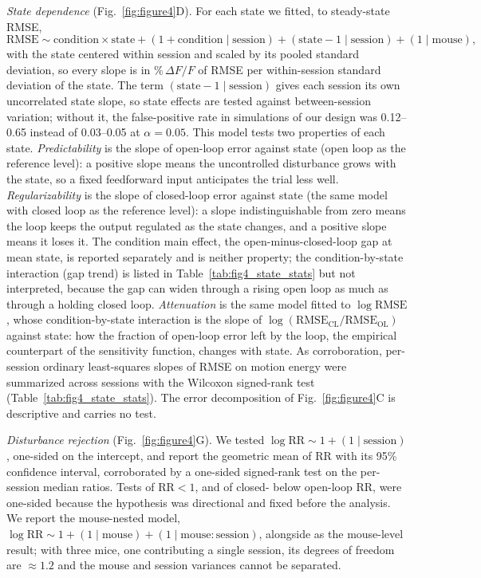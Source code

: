 \emph{State dependence} (Fig.~\ref{fig:figure4}D). For each state we fitted, to
steady-state RMSE,
\begin{equation*}
    \mathrm{RMSE} \sim \mathrm{condition} \times \mathrm{state}
    + (1 + \mathrm{condition} \mid \mathrm{session})
    + (\mathrm{state} - 1 \mid \mathrm{session})
    + (1 \mid \mathrm{mouse}),
\end{equation*}
with the state centered within session and scaled by its pooled standard
deviation, so every slope is in $\%\,\Delta F/F$ of RMSE per within-session
standard deviation of the state. The term $(\mathrm{state} - 1 \mid
\mathrm{session})$ gives each session its own uncorrelated state slope, so state
effects are tested against between-session variation; without it, the
false-positive rate in simulations of our design was 0.12--0.65 instead of
0.03--0.05 at $\alpha = 0.05$. This model tests two properties of each state.
\emph{Predictability} is the slope of open-loop error against state (open loop
as the reference level): a positive slope means the uncontrolled disturbance
grows with the state, so a fixed feedforward input anticipates the trial less
well. \emph{Regularizability} is the slope of closed-loop error against state
(the same model with closed loop as the reference level): a slope
indistinguishable from zero means the loop keeps the output regulated as the
state changes, and a positive slope means it loses it. The condition main
effect, the open-minus-closed-loop gap at mean state, is reported separately and
is neither property; the condition-by-state interaction (gap trend) is
listed in Table~\ref{tab:fig4_state_stats} but not interpreted, because the gap
can widen through a rising open loop as much as through a holding closed loop.
\emph{Attenuation} is the same model fitted to
$\log \mathrm{RMSE}$, whose condition-by-state interaction is the slope of
$\log(\mathrm{RMSE}_{\mathrm{CL}}/\mathrm{RMSE}_{\mathrm{OL}})$ against state:
how the fraction of open-loop error left by the loop, the empirical counterpart
of the sensitivity function, changes with state. As corroboration, per-session
ordinary least-squares slopes of RMSE on motion energy were summarized across
sessions with the Wilcoxon signed-rank test (Table~\ref{tab:fig4_state_stats}).
The error decomposition of Fig.~\ref{fig:figure4}C is descriptive and carries no
test.

\emph{Disturbance rejection} (Fig.~\ref{fig:figure4}G). We tested
$\log \mathrm{RR} \sim 1 + (1 \mid \mathrm{session})$, one-sided on the
intercept, and report the geometric mean of $\mathrm{RR}$ with its 95\%
confidence interval, corroborated by a one-sided signed-rank test on the
per-session median ratios. Tests of $\mathrm{RR} < 1$, and of closed- below
open-loop $\mathrm{RR}$, were one-sided because the hypothesis was directional
and fixed before the analysis. We
report the mouse-nested model, $\log \mathrm{RR} \sim 1 + (1 \mid \mathrm{mouse})
+ (1 \mid \mathrm{mouse}\!:\!\mathrm{session})$, alongside as the mouse-level
result; with three mice, one contributing a single session, its degrees of
freedom are ${\approx}1.2$ and the mouse and session variances cannot be
separated.

